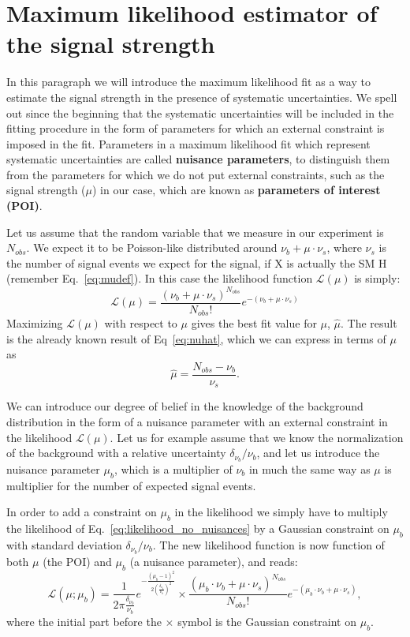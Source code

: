 \documentclass[a4paper,12pt]{article}
\begin{document}
\section{Maximum likelihood estimator of the signal strength}
In this paragraph we will introduce the maximum likelihood fit as a way to
estimate the signal strength in the presence of systematic uncertainties.
We spell out since the beginning that the systematic uncertainties will be
included in the fitting procedure in the form of parameters for which an external
constraint is imposed in the fit. Parameters in a maximum likelihood fit which
represent systematic uncertainties are called {\bf nuisance parameters}, to
distinguish them from the parameters for which we do not put external
constraints, such as the signal strength ($\mu$) in our case, which are known as {\bf
parameters of interest (POI)}. 

Let us assume that the random variable that we measure in our experiment is
$N_{obs}$. We expect it to be Poisson-like distributed around
$\nu_b+\mu\cdot\nu_s$, where $\nu_s$ is the number of signal events we expect
for the signal, if X is actually the SM H (remember Eq.~\ref{eq:mudef}).
In this case the likelihood function $\mathcal{L}(\mu)$ is simply:
\begin{equation}
\mathcal{L}(\mu)=\frac{(\nu_b+\mu\cdot\nu_s)^{N_{obs}}}{N_{obs}!}e^{-(\nu_b+\mu\cdot\nu_s)}
\label{eq:likelihood_no_nuisances}
\end{equation}
Maximizing $\mathcal{L}(\mu)$ with respect to $\mu$ gives the best fit value
for $\mu$, $\hat{\mu}$. The result is the already known result of Eq~\ref{eq:nuhat}, 
which we can express in terms of $\mu$ as
\begin{equation}
\hat{\mu} = \frac{N_{obs}-\nu_b}{\nu_s}.
\end{equation}

We can introduce our degree of belief in the knowledge of the background
distribution in the form of a nuisance parameter with an external constraint
in the likelihood $\mathcal{L}(\mu)$. Let us for example assume that we know
the normalization of the background with a relative uncertainty
$\delta_{\nu_b}/\nu_b$, and let us introduce the nuisance parameter $\mu_b$,
which is a multiplier of $\nu_b$ in much the same way as $\mu$ is multiplier for the
number of expected signal events. 

In order to add a constraint on $\mu_b$ in the likelihood we simply have to
multiply the likelihood of Eq.~\ref{eq:likelihood_no_nuisances} by a Gaussian
constraint on $\mu_b$ with standard deviation $\delta_{\nu_b}/\nu_b$. The new
likelihood function is now function of both $\mu$ (the POI) and $\mu_b$ (a
nuisance parameter), and reads:
\begin{equation}
\mathcal{L}(\mu;\mu_b)=\frac{1}{2\pi\frac{\delta_{\nu_b}}{\nu_b}}e^{-\frac{(\mu_b-1)^2}{2(\frac{\delta_{\nu_b}}{\nu_b})^2}}\times\frac{(\mu_b\cdot\nu_b+\mu\cdot\nu_s)^{N_{obs}}}{N_{obs}!}e^{-(\mu_b\cdot\nu_b+\mu\cdot\nu_s)},
\label{eq:likelihood_nuisance}
\end{equation}
where the initial part before the $\times$ symbol is the Gaussian constraint
on $\mu_b$.
\end{document}
